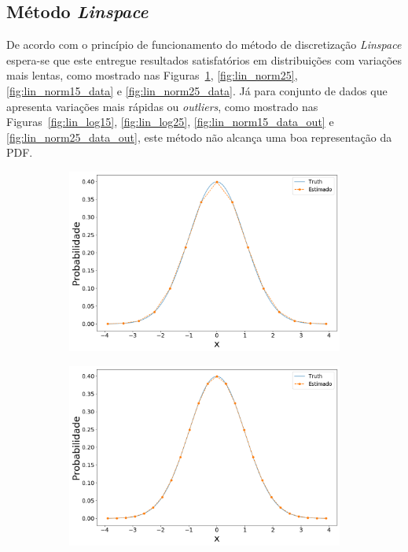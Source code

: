 \subsection{Método \textit{Linspace}}

De acordo com o princípio de funcionamento do método de discretização \textit{Linspace} espera-se que este entregue resultados satisfatórios em distribuições com variações mais lentas, como mostrado nas Figuras~\ref{fig:lin_norm15}, \ref{fig:lin_norm25}, \ref{fig:lin_norm15_data} e \ref{fig:lin_norm25_data}. Já para conjunto de dados que apresenta variações mais rápidas ou \textit{outliers}, como mostrado nas Figuras~\ref{fig:lin_log15}, \ref{fig:lin_log25}, \ref{fig:lin_norm15_data_out} e \ref{fig:lin_norm25_data_out}, este método não alcança uma boa representação da PDF.


\begin{figure}[ht]
	\centering
	\begin{subfigure}[b]{0.45\textwidth}
		\centering 
		\includegraphics[width=\linewidth]{./figuras/Linspace_normal_15}
		\caption{}
		\label{fig:lin_norm15}
	\end{subfigure}
	\hfill
	\begin{subfigure}[b]{0.45\textwidth}
		\centering 
		\includegraphics[width=\linewidth]{./figuras/Linspace_normal_25}

\end{subfigure}
\end{figure}
